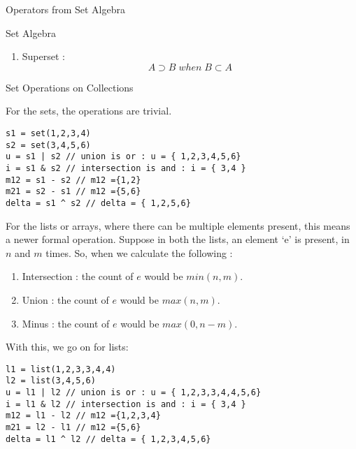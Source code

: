 \begin{section}{Operators from Set Algebra}
\begin{subsection}{Set Algebra}
\begin{enumerate}
{\begin{enumerate}
\item{ Superset : 
$$
A \supset B \; when \; B \subset A 
$$
}
\end{enumerate}}
\end{enumerate}
\end{subsection}

\begin{subsection}{Set Operations on Collections}

For the sets, the operations are trivial.

\begin{center}\begin{minipage}{\linewidth}
\begin{lstlisting}[style=JexlStyle]
s1 = set(1,2,3,4)
s2 = set(3,4,5,6)
u = s1 | s2 // union is or : u = { 1,2,3,4,5,6}
i = s1 & s2 // intersection is and : i = { 3,4 }
m12 = s1 - s2 // m12 ={1,2}
m21 = s2 - s1 // m12 ={5,6}
delta = s1 ^ s2 // delta = { 1,2,5,6}
\end{lstlisting}
\end{minipage}\end{center}


For the lists or arrays, where there can be multiple elements present, 
this means a newer formal operation.
Suppose in both the lists, an element `e' is present, in $n$ and $m$ times.
So, when we calculate the following :
\begin{enumerate}
\item{Intersection :
  the count of $e$ would be $min(n,m)$.
}
\item{Union :
  the count of $e$ would be $max(n,m)$.
}
\item{Minus :
  the count of $e$ would be $max(0,n-m)$.
}

\end{enumerate}
With this, we go on for lists:

\begin{center}\begin{minipage}{\linewidth}
\begin{lstlisting}[style=JexlStyle]
l1 = list(1,2,3,3,4,4)
l2 = list(3,4,5,6)
u = l1 | l2 // union is or : u = { 1,2,3,3,4,4,5,6}
i = l1 & l2 // intersection is and : i = { 3,4 }
m12 = l1 - l2 // m12 ={1,2,3,4}
m21 = l2 - l1 // m12 ={5,6}
delta = l1 ^ l2 // delta = { 1,2,3,4,5,6}
\end{lstlisting}
\end{minipage}\end{center}


\end{subsection}
\end{section}
